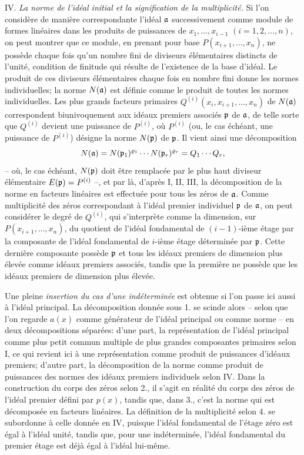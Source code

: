IV. \emph{La norme de l'idéal initial et la signification de la multiplicité.} Si l'on considère de manière correspondante l'idéal $\mathfrak a$ successivement comme module de formes linéaires dans les produits de puissances de $x_1,\ldots,x_{i-1}$ $(i=1,2,\ldots,n)$, on peut montrer que ce module, en prenant pour base $P(x_{i+1},\ldots,x_n)$, ne possède chaque fois qu'un nombre fini de diviseurs élémentaires distincts de l'unité, condition de finitude qui résulte de l'existence de la base d'idéal. Le produit de ces diviseurs élémentaires chaque fois en nombre fini donne les normes individuelles; la norme $N(\mathfrak a)$ est définie comme le produit de toutes les normes individuelles. Les plus grands facteurs primaires $Q^{(i)}(x_i,x_{i+1},\ldots,x_n)$ de $N(\mathfrak a)$ correspondent biunivoquement aux idéaux premiers associés $\mathfrak p$ de $\mathfrak a$, de telle sorte que $Q^{(i)}$ devient une puissance de $P^{(i)}$, où $P^{(i)}$ (ou, le cas échéant, une puissance de $P^{(i)}$) désigne la norme $N(\mathfrak p)$ de $\mathfrak p$. Il vient ainsi une décomposition
\[
 N(\mathfrak a)=N(\mathfrak p_1)^{\varrho_1}\cdots N(\mathfrak p_r)^{\varrho_r}=Q_1\cdots Q_r,
\]
-- où, le cas échéant, $N(\mathfrak p)$ doit être remplacée par le plus haut diviseur élémentaire $E(\mathfrak p)=P^{(i)}$ --, et par là, d'après I, II, III, la décomposition de la norme en facteurs linéaires est effectuée pour tous les zéros de $\mathfrak a$. Comme multiplicité des zéros correspondant à l'idéal premier individuel $\mathfrak p$ de $\mathfrak a$, on peut considérer le degré de $Q^{(i)}$, qui s'interprète comme la dimension, sur $P(x_{i+1},\ldots,x_n)$, du quotient de l'idéal fondamental de $(i-1)$-ième étage par la composante de l'idéal fondamental de $i$-ième étage déterminée par $\mathfrak p$. Cette dernière composante possède $\mathfrak p$ et tous les idéaux premiers de dimension plus élevée comme idéaux premiers associés, tandis que la première ne possède que les idéaux premiers de dimension plus élevée.

Une pleine \emph{insertion du cas d'une indéterminée} est obtenue si l'on passe ici aussi à l'idéal principal. La décomposition donnée sous 1. se scinde alors -- selon que l'on regarde $a(x)$ comme générateur de l'idéal principal ou comme norme -- en deux décompositions séparées: d'une part, la représentation de l'idéal principal comme plus petit commun multiple de plus grandes composantes primaires selon I, ce qui revient ici à une représentation comme produit de puissances d'idéaux premiers; d'autre part, la décomposition de la norme comme produit de puissances des normes des idéaux premiers individuels selon IV. Dans la construction du corps des zéros selon 2., il s'agit en réalité du corps des zéros de l'idéal premier défini par $p(x)$, tandis que, dans 3., c'est la norme qui est décomposée en facteurs linéaires. La définition de la multiplicité selon 4. se subordonne à celle donnée en IV, puisque l'idéal fondamental de l'étage zéro est égal à l'idéal unité, tandis que, pour une indéterminée, l'idéal fondamental du premier étage est déjà égal à l'idéal lui-même.

